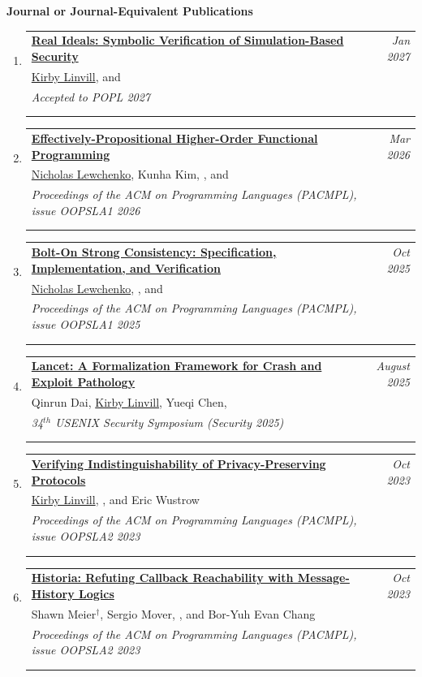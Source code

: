 \documentclass{article}
\makeatletter
\newenvironment{benumerate}[2]{
    \let\oldItem\item
    \def\item{\addtocounter{enumi}{-2}\oldItem}
    \begin{enumerate}[#2] \itemsep3pt
    \setcounter{enumi}{#1}
    \addtocounter{enumi}{1}}
  {\end{enumerate}}
\newenvironment{region}[3]{%
  {{\textbf{#1}}}
  \begin{benumerate}{#3}{\color{RoyalBlue}#2}}
  {\end{benumerate}\vspace{0.8ex}}
\newenvironment{publication}[6]
{ \item
  \begin{tabular*}{6.8in}{p{6in}@{\extracolsep{\fill}}r}
    \href{#1}{\textbf{#2}} & \textit{#3}\\ #4 &\\ \textit{#5}&\\
    \ifthenelse{\equal{#6}{}}{}{#6&\\}
  \end{tabular*}
} {}
\makeatother
\begin{document}
\begin{region} {Journal or Journal-Equivalent Publications}{{J}1}{12}

\begin{publication}{}
		{Real Ideals: Symbolic Verification of Simulation-Based Security}
    {Jan 2027}{\underline{Kirby Linvill}, and \ugkaki}
    {Accepted to POPL 2027}{Full paper (25 pages)}
\end{publication}


\begin{publication}{https://dl.acm.org/doi/10.1145/3798259}
		{Effectively-Propositional Higher-Order Functional Programming}
    {Mar 2026}{\underline{Nicholas Lewchenko}, Kunha Kim, \bec, and \ugkaki}
    {Proceedings of the ACM on Programming Languages (PACMPL), issue OOPSLA1
    2026}
    {Article No.: 151; Pages: 1627 - 1653}
\end{publication}


\begin{publication}{https://dl.acm.org/doi/10.1145/3720502}
		{Bolt-On Strong Consistency: Specification, Implementation, and Verification}
    {Oct 2025}{\underline{Nicholas Lewchenko}, \ugkaki, and \bec}
    {Proceedings of the ACM on Programming Languages (PACMPL), issue OOPSLA1
    2025}
    {Article No.: 137; Pages: 1604 - 1631; Acceptance rate: 32\%}
\end{publication}

\begin{publication} {https://www.usenix.org/conference/usenixsecurity25/presentation/dai}
		{Lancet: A Formalization Framework for Crash and Exploit Pathology}
		{August 2025} {Qinrun Dai, \underline{Kirby Linvill}, Yueqi Chen, \ugkaki}
		{34$^{th}$ USENIX Security Symposium (Security 2025)}
    {Pages 375 - 394 (double column); Accceptance rate: 17\%}
\end{publication}

\begin{publication}{https://gowthamk.github.io/docs/oopsla23a.pdf}
		{Verifying Indistinguishability of Privacy-Preserving Protocols } {Oct
    2023}{\underline{Kirby Linvill}, \ugkaki, and Eric Wustrow}
    {Proceedings of the ACM on Programming Languages (PACMPL), issue
    OOPSLA2 2023} 
    {Article No.: 273; Pages 1442 - 1469; Acceptance rate: 38\%}
\end{publication}

\begin{publication}{https://gowthamk.github.io/docs/oopsla23b.pdf}
		{Historia: Refuting Callback Reachability with Message-History Logics}
    {Oct 2023}{Shawn Meier$^\dag$, Sergio Mover, \ugkaki, and Bor-Yuh Evan Chang}
    {Proceedings of the ACM on Programming Languages (PACMPL), issue OOPSLA2
    2023}
    {Article No.: 289; Pages 1905 - 1934; Acceptance rate: 38\%}
\end{publication}


\end{region}
\end{document}
